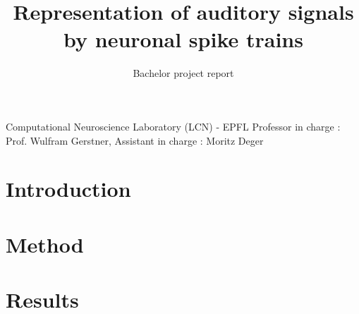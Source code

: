 \documentclass[nocopyrightspace,11pt,authoryear,preprint]{sigplanconf}
\begin{document}
\title{Representation of auditory signals by neuronal spike trains}
\subtitle{Bachelor project report} 

           {Computational Neuroscience Laboratory (LCN) - EPFL}
					 {Professor in charge : Prof. Wulfram Gerstner, Assistant in charge : Moritz Deger}

\maketitle

\section{Introduction}


\section{Method}


\section{Results}





\end{document}
